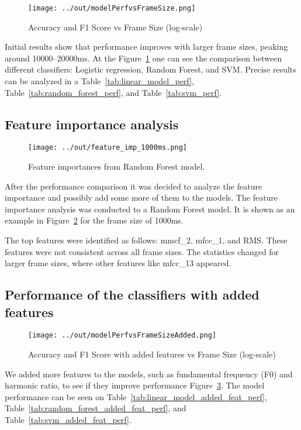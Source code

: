 \documentclass[conference]{IEEEtran}
\begin{document}
\begin{figure}[h]
    \centering
    \texttt{[image: ../out/modelPerfvsFrameSize.png]}
    \caption{Accuracy and F1 Score vs Frame Size (log-scale)}
    \label{fig:model_perf}
\end{figure}

Initial results show that performance improves with larger frame sizes, peaking around 10000–20000ms.
At the Figure~\ref{fig:model_perf} one can see the comparison between different classifiers: Logistic regression, Random Forest, and SVM.
Precise results can be analyzed in a Table~\ref{tab:linear_model_perf}, Table~\ref{tab:random_forest_perf}, and Table~\ref{tab:svm_perf}.

\subsection{Feature importance analysis}

\begin{figure}[h]
    \centering
    \texttt{[image: ../out/feature\_imp\_1000ms.png]}
    \caption{Feature importances from Random Forest model.}
    \label{fig:feature_importance}
\end{figure}

After the performance comparison it was decided to analyze the feature importance and possibly add some more of them to the models.
The feature importance analysis was conducted to a Random Forest model. 
It is shown as an example in Figure~\ref{fig:feature_importance} for the frame size of 1000ms.

The top features were identified as follows: mmcf\_2, mfcc\_1, and RMS. 
These features were not consistent across all frame sizes. 
The statistics changed for larger frame sizes, where other features like mfcc\_13 appeared.

\subsection{Performance of the classifiers with added features}

\begin{figure}[h]
    \centering
    \texttt{[image: ../out/modelPerfvsFrameSizeAdded.png]}
    \caption{Accuracy and F1 Score with added features vs Frame Size (log-scale)}
    \label{fig:model_perf_added}
\end{figure}

We added more features to the models, such as fundamental frequency (F0) and harmonic ratio, to see if they improve performance Figure~\ref{fig:model_perf_added}.
The model performance can be seen on Table~\ref{tab:linear_model_added_feat_perf}, Table~\ref{tab:random_forest_added_feat_perf}, and Table~\ref{tab:svm_added_feat_perf}.
\end{document}
